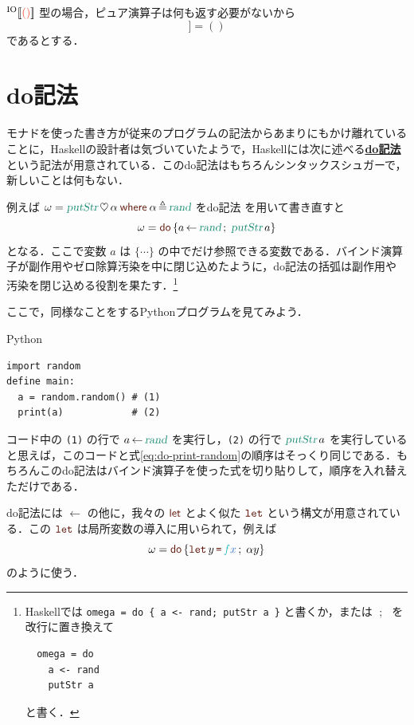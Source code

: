\documentclass[a5paper,twoside,fleqn,draft]{jsbook}
\def\[{[\![}
\def\]{]\!]}
\def\keywordColor{Sepia}
\def\varColor{NavyBlue}
\def\funcColor{BlueGreen}
\def\actionColor{PineGreen}
\def\typeColor{RedOrange}
\newcommand{\programminglanguage}[1]{\textsf{#1}}
\newcommand{\haskell}{\programminglanguage{Haskell}}
\newcommand{\python}{\programminglanguage{Python}}
\newcommand{\keyword}[1]{{\underline{\textbf{#1}}}}
\newcommand{\code}[1]{\texttt{#1}}
\newenvironment{pythoncode}{\begin{itembox}[r]{\python}}{\end{itembox}}
\newcommand{\mKeyword}[1]{\textcolor{\keywordColor}{\mathsf{#1}}}
\newcommand{\mVarKeyword}[1]{\textcolor{\keywordColor}{\texttt{#1}}}
\newcommand{\mDoKeyword}{\mKeyword{do}}
\newcommand{\mDoLetKeyword}{\mVarKeyword{let}}
\newcommand{\mLetKeyword}{\mKeyword{let}}
\newcommand{\mWhereKeyword}{\mKeyword{where}}
\DeclareMathOperator{\mDoKW}{\mDoKeyword}
\newcommand{\mVar}[1]{\textcolor{\varColor}{#1}}
\newcommand{\mXVar}{\mVar{x}}
\newcommand{\mFunc}[1]{\textcolor{\funcColor}{#1}}
\newcommand{\mFFunc}{{\mFunc{f}}}
\newcommand{\mActionLong}[1]{\textcolor{\actionColor}{\textsl{#1}}}
\DeclareMathOperator{\mPutStr}{\mActionLong{putStr}}
\DeclareMathOperator{\mRand}{\mActionLong{rand}}
\DeclareMathOperator{\mBind}{\heartsuit}
\DeclareMathOperator{\mDoEq}{\leftarrow}
\DeclareMathOperator{\mDoLetEq}{\mVarKeyword{=}}
\DeclareMathOperator{\mDoNext}{;\;}
\DeclareMathOperator{\mLetEq}{\triangleq}
\newcommand{\mType}[1]{\textcolor{\typeColor}{\mathbf{#1}}}
\newcommand{\mUnitType}{\mType{()}}
\newcommand{\mTypeAssemble}[2]{{}^\mathrm{#1}\[\mType{#2}\]}
\newcommand{\mIOType}[1]{\mTypeAssemble{IO}{#1}}
\newcommand{\mIOUnitType}{\mIOType{\mUnitType}}
\newcommand{\mPureWith}[1]{\[\mVar{#1}\]}
\newcommand{\mTupleWith}[1]{\left(#1\right)}
\newcommand{\mDo}[1]{\mDoKW\left\{#1\right\}}
\newcommand{\mDoLet}[2]{\mathop{\mDoLetKeyword}#1\mDoLetEq#2}
\newcommand{\mWhereIsEXP}[2]{\mathbin{\mWhereKeyword}#1\mLetEq#2} %
\begin{document}
$\mIOUnitType$ 型の場合，ピュア演算子は何も返す必要がないから
\begin{equation}
\mPureWith{\_}=()
\end{equation}
であるとする．





\section{do記法}

モナドを使った書き方が従来のプログラムの記法からあまりにもかけ離れていることに，\haskell の設計者は気づいていたようで，\haskell には次に述べる\keyword{do記法}という記法が用意されている．このdo記法はもちろんシンタックスシュガーで，新しいことは何もない．

例えば $\omega=\mPutStr\mBind\alpha\mWhereIsEXP{\alpha}{\mRand}$ をdo記法
を用いて書き直すと
\begin{equation}
\label{eq:do-print-random}
\omega=\mDo{a\mDoEq\mRand\mDoNext\mPutStr a}
\end{equation}
となる．ここで変数 $a$ は $\{\dotsb\}$ の中でだけ参照できる変数である．バインド演算子が副作用やゼロ除算汚染を中に閉じ込めたように，do記法の括弧は副作用や汚染を閉じ込める役割を果たす．\footnote{\haskell では \code{omega = do \{ a <- rand; putStr
a \}} と書くか，または $\mDoNext$ を改行に置き換えて
\begin{verbatim}
  omega = do
    a <- rand
    putStr a
\end{verbatim}
と書く．}

ここで，同様なことをする\python プログラムを見てみよう．
\begin{pythoncode}
\begin{verbatim}
import random
define main:
  a = random.random() # (1)
  print(a)            # (2)
\end{verbatim}
\end{pythoncode}
コード中の \code{(1)} の行で $a\mDoEq\mRand$ を実行し，\code{(2)} の行で $\mPutStr a$ を実行していると思えば，このコードと式\eqref{eq:do-print-random}の順序はそっくり同じである．もちろんこのdo記法はバインド演算子を使った式を切り貼りして，順序を入れ替えただけである．

do記法には $\mDoEq$ の他に，我々の $\mLetKeyword$ とよく似た $\mDoLetKeyword$ という構文が用意されている．この $\mDoLetKeyword$ は局所変数の導入に用いられて，例えば
\begin{equation}
\omega=\mDo{\mDoLet{y}{\mFFunc\mXVar}\mDoNext\alpha y}
\end{equation}
のように使う．
\end{document}
